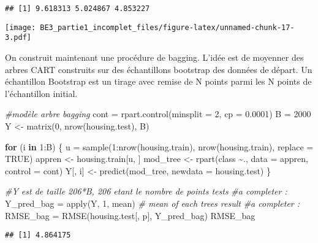 \documentclass[
]{article}
\newenvironment{Shaded}{\begin{snugshade}}{\end{snugshade}}
\newcommand{\AttributeTok}[1]{\textcolor[rgb]{0.77,0.63,0.00}{#1}}
\newcommand{\CommentTok}[1]{\textcolor[rgb]{0.56,0.35,0.01}{\textit{#1}}}
\newcommand{\ConstantTok}[1]{\textcolor[rgb]{0.00,0.00,0.00}{#1}}
\newcommand{\ControlFlowTok}[1]{\textcolor[rgb]{0.13,0.29,0.53}{\textbf{#1}}}
\newcommand{\DecValTok}[1]{\textcolor[rgb]{0.00,0.00,0.81}{#1}}
\newcommand{\FloatTok}[1]{\textcolor[rgb]{0.00,0.00,0.81}{#1}}
\newcommand{\FunctionTok}[1]{\textcolor[rgb]{0.00,0.00,0.00}{#1}}
\newcommand{\NormalTok}[1]{#1}
\newcommand{\OtherTok}[1]{\textcolor[rgb]{0.56,0.35,0.01}{#1}}
\newcommand{\SpecialCharTok}[1]{\textcolor[rgb]{0.00,0.00,0.00}{#1}}
\begin{document}
\begin{verbatim}
## [1] 9.618313 5.024867 4.853227
\end{verbatim}

\texttt{[image: BE3\_partie1\_incomplet\_files/figure-latex/unnamed-chunk-17-3.pdf]}

On construit maintenant une procédure de bagging. L'idée est de moyenner
des arbres CART construits sur des échantillons bootstrap des données de
départ. Un échantillon Bootstrap est un tirage avec remise de N points
parmi les N points de l'échantillon initial.

\begin{Shaded}
\begin{Highlighting}[]
\CommentTok{\#modèle arbre bagging}
\NormalTok{cont }\OtherTok{=} \FunctionTok{rpart.control}\NormalTok{(}\AttributeTok{minsplit =} \DecValTok{2}\NormalTok{, }\AttributeTok{cp =} \FloatTok{0.0001}\NormalTok{)}
\NormalTok{B }\OtherTok{=} \DecValTok{2000}
\NormalTok{Y }\OtherTok{\textless{}{-}} \FunctionTok{matrix}\NormalTok{(}\DecValTok{0}\NormalTok{, }\FunctionTok{nrow}\NormalTok{(housing.test), B)}

\ControlFlowTok{for}\NormalTok{ (i }\ControlFlowTok{in} \DecValTok{1}\SpecialCharTok{:}\NormalTok{B) \{}
\NormalTok{  u }\OtherTok{=} \FunctionTok{sample}\NormalTok{(}\DecValTok{1}\SpecialCharTok{:}\FunctionTok{nrow}\NormalTok{(housing.train), }\FunctionTok{nrow}\NormalTok{(housing.train), }\AttributeTok{replace =} \ConstantTok{TRUE}\NormalTok{)}
\NormalTok{  appren }\OtherTok{\textless{}{-}}\NormalTok{ housing.train[u, ]}
\NormalTok{  mod\_tree }\OtherTok{\textless{}{-}} \FunctionTok{rpart}\NormalTok{(class }\SpecialCharTok{\textasciitilde{}}\NormalTok{., }\AttributeTok{data =}\NormalTok{ appren, }\AttributeTok{control =}\NormalTok{ cont)}
\NormalTok{  Y[, i] }\OtherTok{\textless{}{-}} \FunctionTok{predict}\NormalTok{(mod\_tree, }\AttributeTok{newdata =}\NormalTok{ housing.test)}
\NormalTok{\}}

\CommentTok{\#Y est de taille 206*B, 206 etant le nombre de points tests}
\CommentTok{\#a completer :}
\NormalTok{Y\_pred\_bag }\OtherTok{=} \FunctionTok{apply}\NormalTok{(Y, }\DecValTok{1}\NormalTok{, mean)  }\CommentTok{\# mean of each tree\textasciigrave{}s result}
\CommentTok{\#a completer :}
\NormalTok{RMSE\_bag }\OtherTok{=} \FunctionTok{RMSE}\NormalTok{(housing.test[, p], Y\_pred\_bag)}
\NormalTok{RMSE\_bag}
\end{Highlighting}
\end{Shaded}

\begin{verbatim}
## [1] 4.864175
\end{verbatim}
\end{document}
